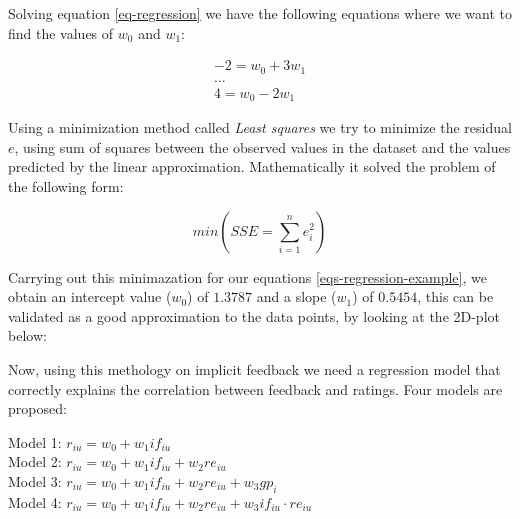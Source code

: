 Solving equation \ref{eq-regression} we have the following equations where we
want to find the values of $w_0$ and $w_1$:

\begin{equation}
  \label{eqs-regression-example}
  \begin{split}
    -2 = w_0 + 3 w_1 \\
    \dots \\
    4 = w_0 - 2 w_1
  \end{split}
\end{equation}

Using a minimization method called \textit{Least squares} we try to minimize
the residual $e$, using sum of squares between the observed values in the
dataset and the values predicted by the linear approximation. Mathematically it
solved the problem of the following form:

\begin{equation}
  min (SSE = \sum_{i=1}^{n} e_i^2)
\end{equation}

Carrying out this minimazation for our equations \ref{eqs-regression-example},
we obtain an intercept value ($w_0$) of $1.3787$ and a slope ($w_1$) of
$0.5454$, this can be validated as a good approximation to the data points, by
looking at the 2D-plot below:

\begin{figure}[H]
  \centering
\end{figure}

Now, using this methology on implicit feedback we need a regression model that
correctly explains the correlation between feedback and ratings. Four models
are proposed:

\noindent
Model 1: $r_{iu} = w_0 + w_1 if_{iu}$ \\
Model 2: $r_{iu} = w_0 + w_1 if_{iu} + w_2 re_{iu}$ \\
Model 3: $r_{iu} = w_0 + w_1 if_{iu} + w_2 re_{iu} + w_3 gp_{i}$ \\
Model 4: $r_{iu} = w_0 + w_1 if_{iu} + w_2 re_{iu} + w_3 if_{iu} \cdot re_{iu}$

